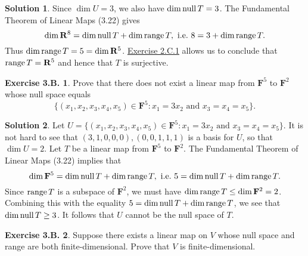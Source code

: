 \documentclass[12pt]{article}
\theoremstyle{definition}
\theoremstyle{exercise}
\newtheorem{exercise}{Exercise 3.B.}
\theoremstyle{solution}
\newtheorem*{solution}{Solution}
\newcommand{\Null}{\text{null\,}}
\newcommand{\Range}{\text{range\,}}
\newcommand{\R}{\mathbf{R}}
\newcommand{\F}{\mathbf{F}}
\begin{document}
\begin{solution}
    Since \( \dim U = 3 \), we also have \( \dim \Null T = 3 \). The Fundamental Theorem of Linear Maps (3.22) gives
    \[
        \dim \R^8 = \dim \Null T + \dim \Range T, \text{ i.e.\ } 8 = 3 + \dim \Range T.
    \]
    Thus \( \dim \Range T = 5 = \dim \R^5 \). \href{https://lew98.github.io/Mathematics/LADR_Section_2_C_Exercises.pdf}{Exercise 2.C.1} allows us to conclude that \( \Range T = \R^5 \) and hence that \( T \) is surjective.
\end{solution}

\begin{exercise}
\label{ex:15}
    Prove that there does not exist a linear map from \( \F^5 \) to \( \F^2 \) whose null space equals
    \[
        \{ (x_1, x_2, x_3, x_4, x_5) \in \F^5 : x_1 = 3 x_2 \text{ and } x_3 = x_4 = x_5 \}.  
    \]
\end{exercise}

\begin{solution}
    Let \( U = \{ (x_1, x_2, x_3, x_4, x_5) \in \F^5 : x_1 = 3 x_2 \text{ and } x_3 = x_4 = x_5 \}. \) It is not hard to see that \( (3, 1, 0, 0, 0), (0, 0, 1, 1, 1) \) is a basis for \( U \), so that \( \dim U = 2 \). Let \( T \) be a linear map from \( \F^5 \) to \( \F^2 \). The Fundamental Theorem of Linear Maps (3.22) implies that
    \[
        \dim \F^5 = \dim \Null T + \dim \Range T, \text{ i.e.\ } 5 = \dim \Null T + \dim \Range T.
    \]
    Since \( \Range T \) is a subspace of \( \F^2 \), we must have \( \dim \Range T \leq \dim \F^2 = 2 \). Combining this with the equality \( 5 = \dim \Null T + \dim \Range T \), we see that \( \dim \Null T \geq 3 \). It follows that \( U \) cannot be the null space of \( T \).
\end{solution}

\begin{exercise}
\label{ex:16}
    Suppose there exists a linear map on \( V \) whose null space and range are both finite-dimensional. Prove that \( V \) is finite-dimensional.
\end{exercise}
\end{document}
